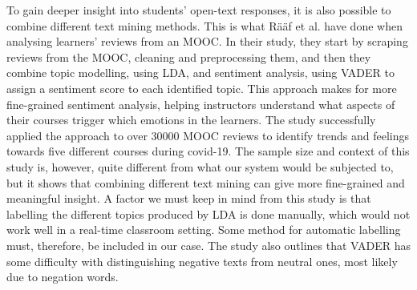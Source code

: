 To gain deeper insight into students' open-text responses, it is also possible to combine different text mining methods. This is what Rääf et al. \cite{raaf2021} have done when analysing learners' reviews from an MOOC. In their study, they start by scraping reviews from the MOOC, cleaning and preprocessing them, and then they combine topic modelling, using LDA, and sentiment analysis, using VADER to assign a sentiment score to each identified topic. This approach makes for more fine-grained sentiment analysis, helping instructors understand what aspects of their courses trigger which emotions in the learners. The study successfully applied the approach to over 30000 MOOC reviews to identify trends and feelings towards five different courses during covid-19. The sample size and context of this study is, however, quite different from what our system would be subjected to, but it shows that combining different text mining can give more fine-grained and meaningful insight. A factor we must keep in mind from this study is that labelling the different topics produced by LDA is done manually, which would not work well in a real-time classroom setting. Some method for automatic labelling must, therefore, be included in our case. The study also outlines that VADER has some difficulty with distinguishing negative texts from neutral ones, most likely due to negation words.

